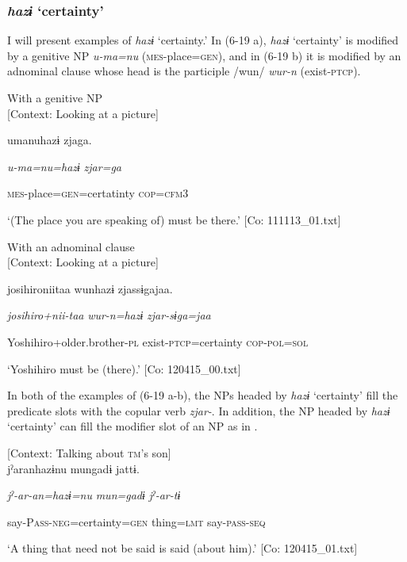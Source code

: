 \subsubsection{\textit{hazɨ} ‘certainty’}

I will present examples of \textit{hazɨ} ‘certainty.’ In (6-19 a), \textit{hazɨ} ‘certainty’ is modified by a genitive NP \textit{u-ma=nu} (\textsc{mes}-place=\textsc{gen}), and in (6-19 b) it is modified by an adnominal clause whose head is the participle /wun/ \textit{wur-n} (exist-\textsc{ptcp}).

\ea\label{ex:6-19}
\ea With a genitive NP\\{}
[Context: Looking at a picture]

{\TM}
\gll umanuhazɨ  zjaga.

      \textit{u-ma=nu=hazɨ}  \textit{zjar=ga}

      \textsc{mes}-place=\textsc{gen}=certatinty  \textsc{cop}=\textsc{cfm}3

\glt ‘(The place you are speaking of) must be there.’ [Co: 111113\_01.txt]
\z

 \ex With an adnominal clause\\{}
[Context: Looking at a picture]

{\TM}
\gll josihironiitaa  wunhazɨ  zjassɨgajaa.

      \textit{josihiro+nii-taa}  \textit{wur-n=hazɨ}  \textit{zjar-sɨga=jaa}

      Yoshihiro+older.brother-\textsc{pl}  exist-\textsc{ptcp}=certainty  \textsc{cop}-\textsc{pol}=\textsc{sol}

\glt ‘Yoshihiro must be (there).’ [Co: 120415\_00.txt]
\z

In both of the examples of (6-19 a-b), the NPs headed by \textit{hazɨ} ‘certainty’ fill the predicate slots with the copular verb \textit{zjar-}. In addition, the NP headed by \textit{hazɨ} ‘certainty’ can fill the modifier slot of an NP as in .

\ea\label{ex:6-20}
 [Context: Talking about \textsc{tm}’s son]\\

{\TM}
\gll jˀaranhazɨnu  mungadɨ  jattɨ.

    \textit{jˀ-ar-an=hazɨ=nu}  \textit{mun=gadɨ}  \textit{jˀ-ar-tɨ}

    say-P\textsc{ass}-\textsc{neg}=certainty=\textsc{gen}  thing=\textsc{lmt}  say-\textsc{pass}-\textsc{seq}

\glt    ‘A thing that need not be said is said (about him).’ [Co: 120415\_01.txt]
\z

